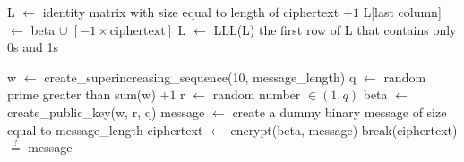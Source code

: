 \begin{algorithm}[H]
    \begin{algorithmic}
        \item[] 
            \State L $\leftarrow$ identity matrix with size equal to length of ciphertext $+ 1$
            \State L[last column] $\leftarrow$ beta $\cup$ $[-1 \times \text{ciphertext}]$ 
            \State L $\leftarrow$ LLL(L)
            \State \Return the first row of L that contains only 0s and 1s
        \EndFunction
        \item[]
        \State w $\leftarrow$ create\_superincreasing\_sequence(10, message\_length)
        \State q $\leftarrow$ random prime greater than sum(w) $+ 1$
        \State r $\leftarrow$ random number $\in (1, q)$
        \State beta $\leftarrow$ create\_public\_key(w, r, q)
        \State message $\leftarrow$ create a dummy binary message of size equal to message\_length
        \State ciphertext $\leftarrow$ encrypt(beta, message)
        \State break(ciphertext) $\stackrel{?}{=}$ message
    \end{algorithmic}
\end{algorithm}
